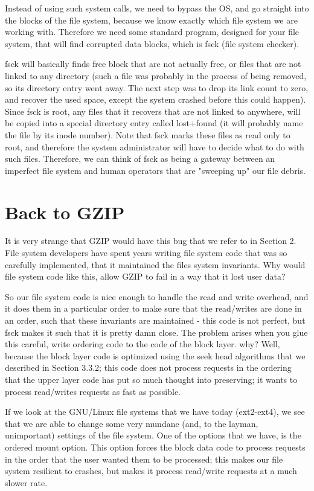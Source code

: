 \documentclass[a4paper]{article}
\begin{document}
Instead of using such system calls, we need to bypass the OS, and go straight into the blocks of the file system, because we know exactly which file system we are working with. Therefore we need some standard program, designed for your file system, that will find corrupted data blocks, which is fsck (file system checker). 

fsck will basically finds free block that are not actually free, or files that are not linked to any directory (such a file was probably in the process of being removed, so its directory entry went away. The next step was to drop its link count to zero, and recover the used space, except the system crashed before this could happen). Since fsck is root, any files that it recovers that are not linked to anywhere, will be copied into a special directory entry called lost+found (it will probably name the file by its inode number). Note that fsck marks these files as read only to root, and therefore the system administrator will have to decide what to do with such files. Therefore, we can think of fsck as being a gateway between an imperfect file system and human operators that are "sweeping up" our file debris. 

\section{Back to GZIP}
It is very strange that GZIP would have this bug that we refer to in Section 2. File system developers have spent years writing file system code that was so carefully implemented, that it maintained the files system invariants. Why would file system code like this, allow GZIP to fail in a way that it lost user data?

So our file system code is nice enough to handle the read and write overhead, and it does them in a particular order to make sure that the read/writes are done in an order, such that these invariants are maintained - this code is not perfect, but fsck makes it such that it is pretty damn close. The problem arises when you glue this careful, write ordering code to the code of the block layer. why? Well, because the block layer code is optimized using the seek head algorithms that we described in Section 3.3.2; this code does not process requests in the ordering that the upper layer code has put so much thought into preserving; it wants to process read/writes requests as fast as possible. 

If we look at the GNU/Linux file systems that we have today (ext2-ext4), we see that we are able to change some very mundane (and, to the layman, unimportant) settings of the file system. One of the options that we have, is the ordered mount option. This option forces the block data code to process requests in the order that the user wanted them to be processed; this makes our file system resilient to crashes, but makes it process read/write requests at a much slower rate. 
\end{document}
